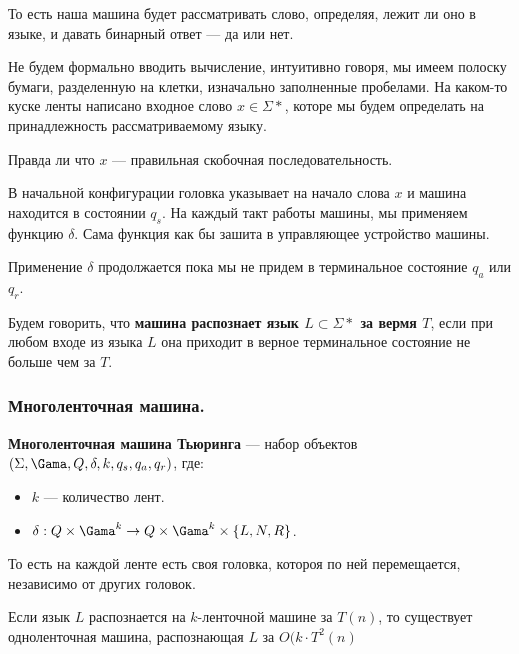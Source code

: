 То есть наша машина будет рассматривать слово, определяя, лежит ли оно в языке, и давать бинарный ответ --- да или нет.

Не будем формально вводить вычисление, интуитивно говоря, мы имеем полоску бумаги, разделенную на клетки, изначально заполненные пробелами.
На каком-то куске ленты написано входное слово $x \in \Sigma*$, которе мы будем определать на принадлежность рассматриваемому языку.

\begin{Example}
   Правда ли что $x$ --- правильная скобочная последовательность.
\end{Example}

В начальной конфигурации головка указывает на начало слова $x$ и машина находится в состоянии  $q_s$. 
На каждый такт работы машины, мы применяем функцию  $\delta$. Сама функция как бы зашита в управляющее устройство машины. 

Применение  $\delta$ продолжается пока мы не придем в терминальное состояние  $q_a$ или  $q_r$.

\begin{Def}
     Будем говорить, что \textbf{машина распознает язык $L \subset \Sigma*$ за вермя $T$}, 
     если при любом входе из языка $L$ она приходит в верное терминальное состояние не больше чем за $T$. 
\end{Def}

\subsubsection{Многоленточная машина.}
\begin{Def}
    \textbf{Многоленточная машина Тьюринга} --- набор объектов $(\Sigma, \Gama, Q, \delta, k, q_s, q_a, q_r)$, где:
    \begin{itemize}
        \item $k$ --- количество лент.
        \item $\delta: Q \times \Gama^k \to Q \times \Gama^k \times \{L, N, R\}$.
    \end{itemize}
\end{Def}

То есть на каждой ленте есть своя головка, котороя по ней перемещается, независимо от других головок.

\begin{Theorem}
    Если язык $L$ распознается на  $k$-ленточной машине за  $T(n)$, то существует одноленточная машина, распознающая $L$ за  $O(k \cdot T^2(n)$ 
\end{Theorem}

